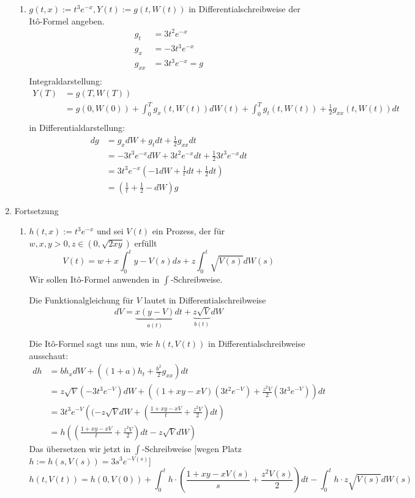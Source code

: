 \documentclass[a4paper,11pt,notitlepage,fullpage]{article}
\begin{document}
\begin{enumerate}
\begin{enumerate}
\item $g(t,x):= t^3e^{-x}, Y(t):=g(t, W(t))$ in Differentialschreibweise der Itô-Formel angeben.
\begin{align*}
g_t &= 3t^2e^{-x}\\
g_x &= -3t^3e^{-x}\\
g_{xx} &= 3t^3e^{-x} = g\\
\end{align*}
Integraldarstellung:
\begin{align*}
Y(T) &= g(T, W(T))\\
&= g(0, W(0)) + \int_0^T g_x(t, W(t)) dW(t) + \int_0^T g_t(t, W(t)) + \frac{1}{2} g_{xx}(t, W(t)) dt\\
\end{align*}
in Differentialdarstellung:
\begin{align*}
dg &= g_x dW + g_t dt + \frac{1}{2} g_{xx} dt\\
&= -3t^3e^{-x} dW + 3t^2e^{-x} dt + \frac{1}{2} 3t^3e^{-x} dt\\
&= 3t^3e^{-x} \left(-1dW + \frac{1}{t} dt +\frac{1}{2} dt \right)\\
&= \left(\frac{1}{t} + \frac{1}{2} -dW \right)g
\end{align*}

\end{enumerate}

\item Fortsetzung
\begin{enumerate}
\item $h(t,x):= t^3e^{-x}$ und sei $V(t)$ ein Prozess, der für $w,x,y>0, z\in (0, \sqrt{2xy})$ erfüllt
$$V(t) = w + x\int_0^t y-V(s) ds + z\int_0^t \sqrt{V(s)} dW(s)$$
Wir sollen Itô-Formel anwenden in $\int$-Schreibweise.

Die Funktionalgleichung für $V$ lautet in Differentialschreibweise
$$dV = \underbrace{x(y-V)}_{a(t)}dt + \underbrace{z\sqrt{V}}_{b(t)}dW$$

Die Itô-Formel sagt uns nun, wie $h(t, V(t))$ in Differentialschreibweise ausschaut:
\begin{align*}
dh &= b h_x dW + \left( (1+a)h_t +\frac{b^2}{2} g_{xx}  \right) dt\\
&= z\sqrt{V} (-3t^3e^{-V}) dW + \left( (1+xy-xV) (3t^2e^{-V}) + \frac{z^2V}{2} (3t^3e^{-V})  \right) dt\\
&= 3t^3e^{-V} \left((-z\sqrt{V}dW + \left(\frac{1+xy-xV}{t} + \frac{z^2V}{2} \right) dt \right)\\
&= h \left(\left(\frac{1+xy-xV}{t} + \frac{z^2V}{2} \right) dt  -z\sqrt{V}dW \right)
\end{align*}
Das übersetzen wir jetzt in $\int$-Schreibweise [wegen Platz $h:=h(s,V(s))=3s^3e^{-V(s)}$]
$$h(t,V(t)) = h(0, V(0)) + \int_0^t h\cdot\left(\frac{1+xy-xV(s)}{s} + \frac{z^2V(s)}{2}\right) dt  - \int_0^t h\cdot z\sqrt{V(s)}dW(s)$$


\end{enumerate}
\end{enumerate}
\end{document}
